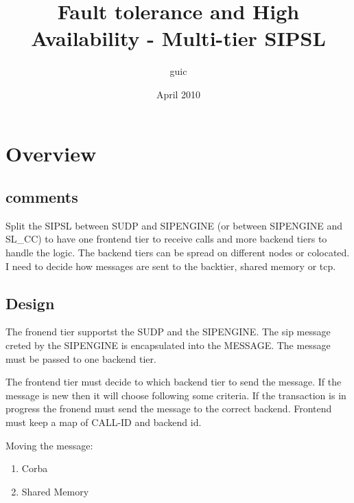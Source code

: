 \documentclass[a4paper]{article}
\title{Fault tolerance and High Availability - Multi-tier SIPSL}
\author{guic}
\date{April 2010}
\begin{document}
	\small
	\maketitle 
\section{Overview}

\subsection{comments}
Split the SIPSL between SUDP and SIPENGINE (or between SIPENGINE and SL_CC) to
have one frontend tier to receive calls and more backend tiers to handle the
logic. The backend tiers can be spread on different nodes or colocated.
I need to decide how messages are sent to the backtier, shared memory or tcp.

\subsection{Design}
The fronend tier supportst the SUDP and the SIPENGINE. The sip message creted by
the SIPENGINE is encapsulated into the MESSAGE. The message must be passed to
one backend tier.

The frontend tier must decide to which backend tier to send the message. If the
message is new then it will choose following some criteria. If the transaction
is in progress the fronend must send the message to the correct backend.
Frontend must keep a map of CALL-ID and backend id.

Moving the message:

\begin{enumerate}
        \item Corba 
        \item Shared Memory
\end{enumerate}
\end{document}
